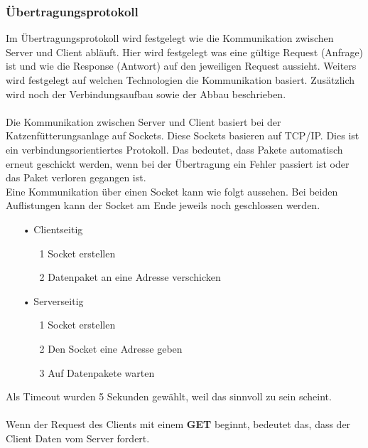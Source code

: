\subsubsection{Übertragungsprotokoll}
Im Übertragungsprotokoll wird festgelegt wie die Kommunikation zwischen Server und Client abläuft. Hier wird festgelegt was eine gültige Request (Anfrage) ist und wie die Response (Antwort) auf den jeweiligen Request aussieht. Weiters wird festgelegt auf welchen Technologien die Kommunikation basiert. Zusätzlich wird noch der Verbindungsaufbau sowie der Abbau beschrieben.
\\ \\
Die Kommunikation zwischen Server und Client basiert bei der Katzenfütterungsanlage auf Sockets. Diese Sockets basieren auf \ac{TCP/IP}. Dies ist ein verbindungsorientiertes Protokoll. Das bedeutet, dass Pakete automatisch erneut geschickt werden, wenn bei der Übertragung ein Fehler passiert ist oder das Paket verloren gegangen ist.
\\ Eine Kommunikation über einen Socket kann wie folgt aussehen. Bei beiden Auflistungen kann der Socket am Ende jeweils noch geschlossen werden.
\begin{itemize}
\item[•] Clientseitig
	\begin{itemize}
	\item[1] Socket erstellen
	\item[2] Datenpaket an eine Adresse verschicken
    \end{itemize}
\item[•] Serverseitig
	\begin{itemize}
	\item[1] Socket erstellen
	\item[2] Den Socket eine Adresse geben
	\item[3] Auf Datenpakete warten
    \end{itemize}
\end{itemize}
Als Timeout wurden 5 Sekunden gewählt, weil das sinnvoll zu sein scheint.
\\ \\
Wenn der Request des Clients mit einem \textbf{GET} beginnt, bedeutet das, dass der Client Daten vom Server fordert.

